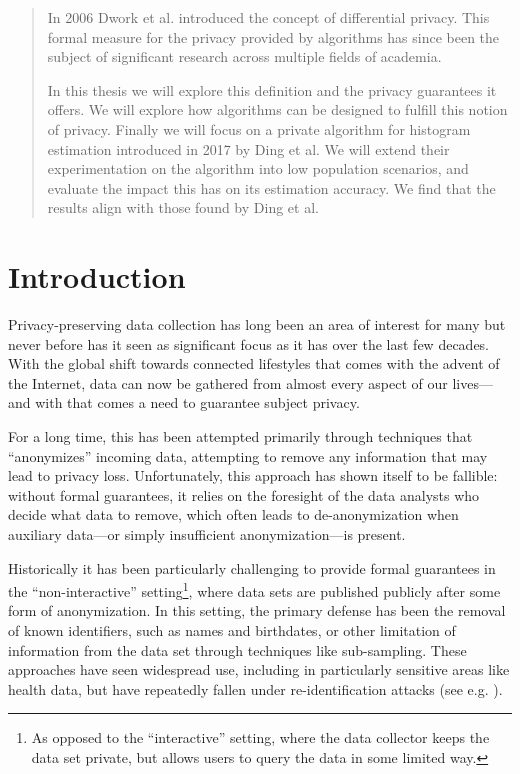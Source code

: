 \documentclass[12pt]{article}
\begin{document}


\renewcommand{\abstractname}{Abstract}
\begin{abstract}
In 2006 Dwork et al. introduced the concept of differential privacy. This formal measure for the privacy provided by algorithms has since been the subject of significant research across multiple fields of academia.

In this thesis we will explore this definition and the privacy guarantees it offers. We will explore how algorithms can be designed to fulfill this notion of privacy. Finally we will focus on a private algorithm for histogram estimation introduced in 2017 by Ding et al. We will extend their experimentation on the algorithm into low population scenarios, and evaluate the impact this has on its estimation accuracy. We find that the results align with those found by Ding et al.
\end{abstract}

\thispagestyle{empty}
\tableofcontents
\newpage

\section{Introduction}

Privacy-preserving data collection has long been an area of interest for many but never before has it seen as significant focus as it has over the last few decades. With the global shift towards connected lifestyles that comes with the advent of the Internet, data can now be gathered from almost every aspect of our lives---and with that comes a need to guarantee subject privacy.

For a long time, this has been attempted primarily through techniques that ``anonymizes'' incoming data, attempting to remove any information that may lead to privacy loss. Unfortunately, this approach has shown itself to be fallible: without formal guarantees, it relies on the foresight of the data analysts who decide what data to remove, which often leads to de-anonymization when auxiliary data---or simply insufficient anonymization---is present.

\bigskip

Historically it has been particularly challenging to provide formal guarantees in the ``non-interactive'' setting\footnote{As opposed to the ``interactive'' setting, where the data collector keeps the data set private, but allows users to query the data in some limited way.}, where data sets are published publicly after some form of anonymization. In this setting, the primary defense has been the removal of known identifiers, such as names and birthdates, or other limitation of information from the data set through techniques like sub-sampling. These approaches have seen widespread use, including in particularly sensitive areas like health data, but have repeatedly fallen under re-identification attacks (see e.g. \cite{reidentification2011}).
\end{document}
